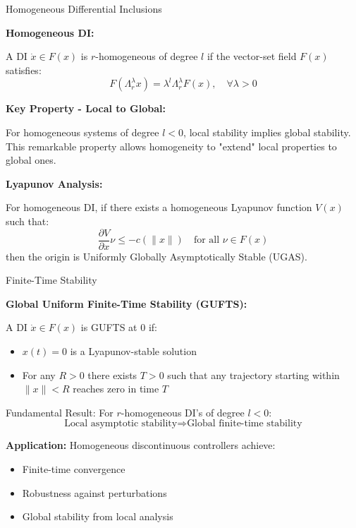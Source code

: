 \begin{frame}{Homogeneous Differential Inclusions}

	\textbf{Homogeneous DI:}

	A DI $\dot{x} \in F(x)$ is $r$-homogeneous of degree $l$ if the vector-set field $F(x)$ satisfies:
	$$F(\Lambda_r^\lambda x) = \lambda^l \Lambda_r^\lambda F(x), \quad \forall \lambda > 0$$

	\vspace{0.5cm}
	\textbf{Key Property - Local to Global:}

	For homogeneous systems of degree $l < 0$, \alert{local stability implies global stability}. This remarkable property allows homogeneity to "extend" local properties to global ones.

	\vspace{0.5cm}
	\textbf{Lyapunov Analysis:}

	For homogeneous DI, if there exists a homogeneous Lyapunov function $V(x)$ such that:
	$$\frac{\partial V}{\partial x} \nu \leq -c(\|x\|) \quad \text{for all } \nu \in F(x)$$
	then the origin is Uniformly Globally Asymptotically Stable (UGAS).

\end{frame}

\begin{frame}{Finite-Time Stability}

	\textbf{Global Uniform Finite-Time Stability (GUFTS):}

	A DI $\dot{x} \in F(x)$ is GUFTS at 0 if:
	\begin{itemize}
		\item $x(t) = 0$ is a Lyapunov-stable solution
		\item For any $R > 0$ there exists $T > 0$ such that any trajectory starting within $\|x\| < R$ reaches zero in time $T$
	\end{itemize}

	\vspace{0.5cm}
	\alert{Fundamental Result:} For $r$-homogeneous DI's of degree $l < 0$:
	$$\text{Local asymptotic stability} \Rightarrow \text{Global finite-time stability}$$

	\vspace{0.5cm}

	\textbf{Application:} Homogeneous discontinuous controllers achieve:
	\begin{itemize}
		\item Finite-time convergence
		\item Robustness against perturbations
		\item Global stability from local analysis
	\end{itemize}
\end{frame}

